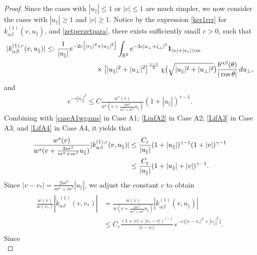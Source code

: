 \documentclass[reqno]{amsart}
\numberwithin{equation}{section}
\numberwithin{equation}{section}
\begin{document}
	\begin{proof}
	\noindent ‌Since the cases with $|u_{\parallel}|\leq 1$ or $|v|\leq 1$ are much simpler, we now consider the cases with  $|u_{\parallel}|\geq 1$ and $|v|\geq 1$. Notice by the expression \eqref{ker1rrr} for $k_{\alpha \beta}^{(1)}(v,u_{\parallel})$, and \eqref{zetperzetpara}, there exists sufficiently small $c>0$, such that
	\begin{align*}
		|k_{\alpha \beta}^{(1),r}(v,u_{\parallel})| &\leq:  \frac{1}{|u_{\parallel}|} e^{-2c\big[|v_{\parallel}|^2+|u_{\parallel}|^2\big]} \int_{\mathbb{R}^2} e^{-2c|u_{\perp} + \zeta_{\perp}|^2} \mathbf{1}_{|v|+|v_*|>m}\notag\\
		&\hspace{2.5cm}\times  \left[|u_{\parallel}|^2 + |u_{\perp}|^2\right]^{\frac{\gamma - 1}{2}} \chi\big(\sqrt{|u_{\parallel}|^2 + |u_{\perp}|^2}\big) \frac{b^{ \alpha \beta}(\theta)}{|\cos \theta|} \, du_{\perp},
	\end{align*} 
	and 
	\begin{align*}
		e^{-c|u_{\parallel}|^2} \leq C \frac{w^s(v)}{w^s(v+\frac{2m^{\beta}}{m^{\alpha}+m^{\beta}}u_{\parallel})} (1+|u_{\parallel}|)^{\gamma-1}.
	\end{align*} 
	Combining with \eqref{caseA1wgams} in Case A1; \eqref{LinfA2} in Case A2; \eqref{LifA3} in Case A3; and \eqref{LifA4} in Case A4, it yields that
	\begin{align}
		\frac{w^s(v)}{w^s(v+\frac{2m^{\beta}}{m^{\alpha}+m^{\beta}}u_{\parallel})}|k_{\alpha \beta}^{(1),r}(v,u_{\parallel})| &\leq  \frac{C_{\varepsilon}}{|u_{\parallel}|} (1+|u_{\parallel}|)^{\gamma-1}(1+|v|)^{\gamma-1}\notag\\
		&\leq  \frac{C_{\varepsilon}}{|u_{\parallel}|} (1+|u_{\parallel}|+|v|)^{\gamma-1}.\label{F247q}
	\end{align} 
	 Since $|v-v_*|=\frac{2m^{\beta}}{m^{\alpha}+m^{\beta}}|u_{\parallel}|$, we adjust the constant $c$ to obtain
	\begin{eqnarray}\label{rek4444}
		\begin{split}
			\frac{w(v)}{w(v_*)}|\tilde{k}_{\alpha \beta}^{(1)}(v,v_*)|&=\frac{w(v)}{w(v+\frac{2m^{\beta}}{m^{\alpha}+m^{\beta}}u_{\parallel})}|k_{\alpha \beta}^{(1)}(v,u_{\parallel})|\\
			&\leq C_{\varepsilon} \frac{(1+|v|+|v_*-v|)^{\gamma-1}}{|v-v_*|} \, e^{-c\{|v-v_*|^2+|v_{\parallel}|^2\}}.
		\end{split}
	\end{eqnarray}
	Since
	\begin{equation*}

\end{equation*}
\end{proof}
\end{document}
